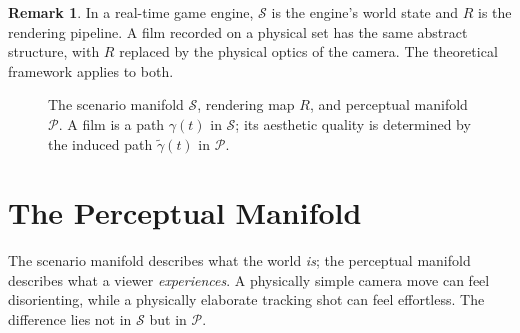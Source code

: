 \documentclass[12pt,a4paper]{article}
\theoremstyle{plain}
\theoremstyle{definition}
\newtheorem{remark}[theorem]{Remark}
\begin{document}
\begin{remark}
In a real-time game engine, $\mathcal{S}$ is the engine's world state and $R$
is the rendering pipeline. A film recorded on a physical set has the same
abstract structure, with $R$ replaced by the physical optics of the camera. The
theoretical framework applies to both.
\end{remark}

\begin{figure}[h]
\centering
{}
\caption{The scenario manifold $\mathcal{S}$, rendering map $R$, and
perceptual manifold $\mathcal{P}$. A film is a path $\gamma(t)$ in $\mathcal{S}$;
its aesthetic quality is determined by the induced path $\tilde\gamma(t)$ in
$\mathcal{P}$.}
\label{fig:manifolds}
\end{figure}

\section{The Perceptual Manifold}
\label{sec:perceptual}

The scenario manifold describes what the world \emph{is}; the perceptual
manifold describes what a viewer \emph{experiences}. A physically simple camera
move can feel disorienting, while a physically elaborate tracking shot can feel
effortless. The difference lies not in $\mathcal{S}$ but in $\mathcal{P}$.
\end{document}
